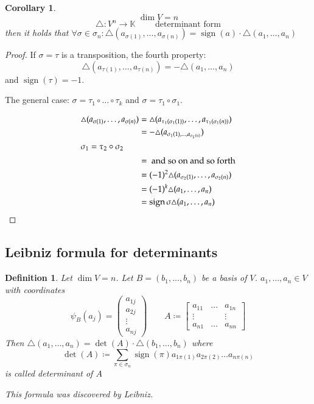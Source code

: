 \documentclass{article}
\newtheorem{definition}{Definition}  \numberwithin{definition}{section}
\newtheorem*{corollary}{Corollary}%
\DeclareMathOperator{\sign}{sign}
\begin{document}
\begin{corollary} %
  \label{cor:719}
  \[ \dim V = n \]
  \[ \triangle: V^n \to \mathbb K \qquad \text{ determinant form} \]
  then it holds that $\forall \sigma \in \sigma_n: \triangle(a_{\sigma(1)}, \dots, a_{\sigma(n)}) = \sign(a) \cdot \triangle(a_1, \dots, a_n)$
\end{corollary}

\begin{proof}
  If $\sigma = \tau$ is a transposition, the fourth property:
  \[ \triangle(a_{\tau(1)}, \dots, a_{\tau(n)}) = -\triangle(a_1, \dots, a_n) \]
  and $\sign(\tau) = -1$.

  The general case: $\sigma = \tau_1 \circ \dots \circ \tau_k$ and $\sigma = \tau_1 \circ \sigma_1$.

  \begin{align*}
    \triangle(a_{\sigma(1)}, \dots, a_{\sigma(n)}) &= \triangle(a_{\tau_1(\sigma_1(1))}, \dots, a_{\tau_1(\sigma_1(n))}) \\
      &= -\triangle(a_{\sigma_1(1), \dots, a_{\sigma_1(n)}}) \\
    \intertext{$\sigma_1 = \tau_2 \circ \sigma_2$}
      &= \text{ and so on and so forth} \\
      &= (-1)^2 \triangle(a_{\sigma_2(1)}, \dots, a_{\sigma_2(n)}) \\
      &= (-1)^k \triangle (a_1, \dots, a_n) \\
      &= \sign\sigma \triangle(a_1, \dots, a_n)
  \end{align*}
\end{proof}

\subsection{Leibniz formula for determinants}

\begin{definition} %
  \label{det}
  Let $\dim V = n$. Let $B = (b_1, \dots, b_n)$ be a basis of $V$. $a_1, \dots, a_n \in V$ with coordinates
  \[
    \psi_B(a_j) = \begin{pmatrix} a_{1j} \\ a_{2j} \\ \vdots \\ a_{nj} \end{pmatrix}
    \qquad
    A \coloneqq \begin{bmatrix} a_{11} & \dots & a_{1n} \\ \vdots &  & \vdots \\ a_{n1} & \dots & a_{nn} \end{bmatrix}
  \]
  Then $\triangle(a_1, \dots, a_n) = \det(A) \cdot \triangle(b_1, \dots, b_n)$
  where
  \[ \det(A) \coloneqq \sum_{\pi \in \sigma_n} \sign(\pi) a_{1\pi(1)} a_{2 \pi(2)} \dots a_{n\pi(n)} \]
  is called \emph{determinant of $A$}

  This formula was discovered by Leibniz.
\end{definition}
\end{document}
